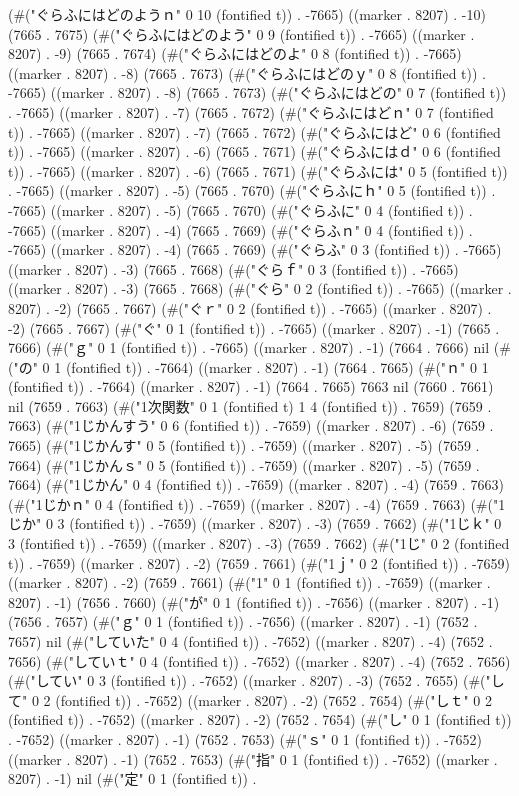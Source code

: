 (#("ぐらふにはどのようｎ" 0 10 (fontified t)) . -7665) ((marker . 8207) . -10) (7665 . 7675) (#("ぐらふにはどのよう" 0 9 (fontified t)) . -7665) ((marker . 8207) . -9) (7665 . 7674) (#("ぐらふにはどのよ" 0 8 (fontified t)) . -7665) ((marker . 8207) . -8) (7665 . 7673) (#("ぐらふにはどのｙ" 0 8 (fontified t)) . -7665) ((marker . 8207) . -8) (7665 . 7673) (#("ぐらふにはどの" 0 7 (fontified t)) . -7665) ((marker . 8207) . -7) (7665 . 7672) (#("ぐらふにはどｎ" 0 7 (fontified t)) . -7665) ((marker . 8207) . -7) (7665 . 7672) (#("ぐらふにはど" 0 6 (fontified t)) . -7665) ((marker . 8207) . -6) (7665 . 7671) (#("ぐらふにはｄ" 0 6 (fontified t)) . -7665) ((marker . 8207) . -6) (7665 . 7671) (#("ぐらふには" 0 5 (fontified t)) . -7665) ((marker . 8207) . -5) (7665 . 7670) (#("ぐらふにｈ" 0 5 (fontified t)) . -7665) ((marker . 8207) . -5) (7665 . 7670) (#("ぐらふに" 0 4 (fontified t)) . -7665) ((marker . 8207) . -4) (7665 . 7669) (#("ぐらふｎ" 0 4 (fontified t)) . -7665) ((marker . 8207) . -4) (7665 . 7669) (#("ぐらふ" 0 3 (fontified t)) . -7665) ((marker . 8207) . -3) (7665 . 7668) (#("ぐらｆ" 0 3 (fontified t)) . -7665) ((marker . 8207) . -3) (7665 . 7668) (#("ぐら" 0 2 (fontified t)) . -7665) ((marker . 8207) . -2) (7665 . 7667) (#("ぐｒ" 0 2 (fontified t)) . -7665) ((marker . 8207) . -2) (7665 . 7667) (#("ぐ" 0 1 (fontified t)) . -7665) ((marker . 8207) . -1) (7665 . 7666) (#("ｇ" 0 1 (fontified t)) . -7665) ((marker . 8207) . -1) (7664 . 7666) nil (#("の" 0 1 (fontified t)) . -7664) ((marker . 8207) . -1) (7664 . 7665) (#("ｎ" 0 1 (fontified t)) . -7664) ((marker . 8207) . -1) (7664 . 7665) 7663 nil (7660 . 7661) nil (7659 . 7663) (#("1次関数" 0 1 (fontified t) 1 4 (fontified t)) . 7659) (7659 . 7663) (#("1じかんすう" 0 6 (fontified t)) . -7659) ((marker . 8207) . -6) (7659 . 7665) (#("1じかんす" 0 5 (fontified t)) . -7659) ((marker . 8207) . -5) (7659 . 7664) (#("1じかんｓ" 0 5 (fontified t)) . -7659) ((marker . 8207) . -5) (7659 . 7664) (#("1じかん" 0 4 (fontified t)) . -7659) ((marker . 8207) . -4) (7659 . 7663) (#("1じかｎ" 0 4 (fontified t)) . -7659) ((marker . 8207) . -4) (7659 . 7663) (#("1じか" 0 3 (fontified t)) . -7659) ((marker . 8207) . -3) (7659 . 7662) (#("1じｋ" 0 3 (fontified t)) . -7659) ((marker . 8207) . -3) (7659 . 7662) (#("1じ" 0 2 (fontified t)) . -7659) ((marker . 8207) . -2) (7659 . 7661) (#("1ｊ" 0 2 (fontified t)) . -7659) ((marker . 8207) . -2) (7659 . 7661) (#("1" 0 1 (fontified t)) . -7659) ((marker . 8207) . -1) (7656 . 7660) (#("が" 0 1 (fontified t)) . -7656) ((marker . 8207) . -1) (7656 . 7657) (#("ｇ" 0 1 (fontified t)) . -7656) ((marker . 8207) . -1) (7652 . 7657) nil (#("していた" 0 4 (fontified t)) . -7652) ((marker . 8207) . -4) (7652 . 7656) (#("していｔ" 0 4 (fontified t)) . -7652) ((marker . 8207) . -4) (7652 . 7656) (#("してい" 0 3 (fontified t)) . -7652) ((marker . 8207) . -3) (7652 . 7655) (#("して" 0 2 (fontified t)) . -7652) ((marker . 8207) . -2) (7652 . 7654) (#("しｔ" 0 2 (fontified t)) . -7652) ((marker . 8207) . -2) (7652 . 7654) (#("し" 0 1 (fontified t)) . -7652) ((marker . 8207) . -1) (7652 . 7653) (#("ｓ" 0 1 (fontified t)) . -7652) ((marker . 8207) . -1) (7652 . 7653) (#("指" 0 1 (fontified t)) . -7652) ((marker . 8207) . -1) nil (#("定" 0 1 (fontified t)) . 